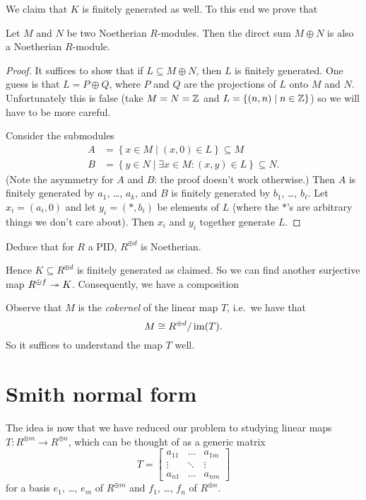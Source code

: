 We claim that $K$ is finitely generated as well.
To this end we prove that
\begin{lemma}
	Let $M$ and $N$ be two Noetherian $R$-modules.
	Then the direct sum $M \oplus N$ is also a Noetherian $R$-module.
\end{lemma}
\begin{proof}
	It suffices to show that if $L \subseteq M \oplus N$,
	then $L$ is finitely generated.
	One guess is that $L = P \oplus Q$,
	where $P$ and $Q$ are the projections of $L$ onto $M$ and $N$.
	Unfortunately this is false
	(take $M = N = \mathbb Z$ and $L = \{(n,n) \mid n \in \mathbb Z\}$)
	so we will have to be more careful.

	Consider the submodules
	\begin{align*}
		A &= \left\{ x \in M \mid (x,0) \in L \right\} \subseteq M \\
		B &= \left\{ y \in N \mid \exists x \in M : (x,y) \in L \right\}
			\subseteq N.
	\end{align*}
	(Note the asymmetry for $A$ and $B$: the proof doesn't work otherwise.)
	Then $A$ is finitely generated by $a_1$, \dots, $a_k$,
	and $B$ is finitely generated by $b_1$, \dots, $b_\ell$.
	Let $x_i = (a_i, 0)$ and let $y_i = (\ast, b_i)$ be elements of $L$
	(where the $\ast$'s are arbitrary things we don't care about).
	Then $x_i$ and $y_i$ together generate $L$.
\end{proof}
\begin{ques}
	Deduce that for $R$ a PID, $R^{\oplus d}$ is Noetherian.
\end{ques}
Hence $K \subseteq R^{\oplus d}$ is finitely generated as claimed.
So we can find another surjective map $R^{\oplus f} \twoheadrightarrow K$.
Consequently, we have a composition
\begin{center}
\end{center}
Observe that $M$ is the \emph{cokernel} of the linear map $T$,
i.e.\ we have that
\[ M \cong R^{\oplus d} / \operatorname{im}(T). \]
So it suffices to understand the map $T$ well.

\section{Smith normal form}
The idea is now that we have reduced our problem to studying
linear maps $T \colon R^{\oplus m} \to R^{\oplus n}$,
which can be thought of as a generic matrix
\[ T = \begin{bmatrix}
		a_{11} & \dots & a_{1m} \\
		\vdots & \ddots & \vdots \\
		a_{n1} & \dots & a_{nm}
	\end{bmatrix} \]
for a basis $e_1$, \dots, $e_m$ of $R^{\oplus m}$
and $f_1$, \dots, $f_n$ of $R^{\oplus n}$.

